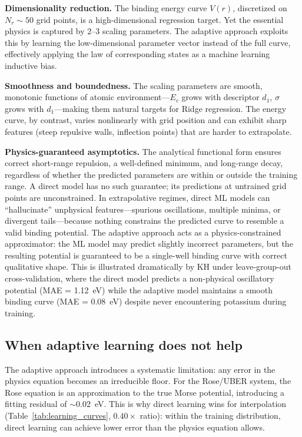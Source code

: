 \documentclass[aps,prb,twocolumn,superscriptaddress,longbibliography,floatfix]{revtex4-2}
\begin{document}
\textbf{Dimensionality reduction.} The binding energy curve $V(r)$, discretized on $N_r \sim 50$ grid points, is a high-dimensional regression target. Yet the essential physics is captured by 2--3 scaling parameters. The adaptive approach exploits this by learning the low-dimensional parameter vector instead of the full curve, effectively applying the law of corresponding states as a machine learning inductive bias.

\textbf{Smoothness and boundedness.} The scaling parameters are smooth, monotonic functions of atomic environment---$E_c$ grows with descriptor $d_1$, $\sigma$ grows with $d_1$---making them natural targets for Ridge regression. The energy curve, by contrast, varies nonlinearly with grid position and can exhibit sharp features (steep repulsive walls, inflection points) that are harder to extrapolate.

\textbf{Physics-guaranteed asymptotics.} The analytical functional form ensures correct short-range repulsion, a well-defined minimum, and long-range decay, regardless of whether the predicted parameters are within or outside the training range. A direct model has no such guarantee; its predictions at untrained grid points are unconstrained. In extrapolative regimes, direct ML models can ``hallucinate'' unphysical features---spurious oscillations, multiple minima, or divergent tails---because nothing constrains the predicted curve to resemble a valid binding potential. The adaptive approach acts as a physics-constrained approximator: the ML model may predict slightly incorrect parameters, but the resulting potential is guaranteed to be a single-well binding curve with correct qualitative shape. This is illustrated dramatically by KH under leave-group-out cross-validation, where the direct model predicts a non-physical oscillatory potential (MAE = 1.12~eV) while the adaptive model maintains a smooth binding curve (MAE = 0.08~eV) despite never encountering potassium during training.

\subsection{When adaptive learning does not help}
\label{sec:limitations}

The adaptive approach introduces a systematic limitation: any error in the physics equation becomes an irreducible floor. For the Rose/UBER system, the Rose equation is an approximation to the true Morse potential, introducing a fitting residual of $\sim$0.02~eV. This is why direct learning wins for interpolation (Table~\ref{tab:learning_curves}, $0.40\times$ ratio): within the training distribution, direct learning can achieve lower error than the physics equation allows.
\end{document}

